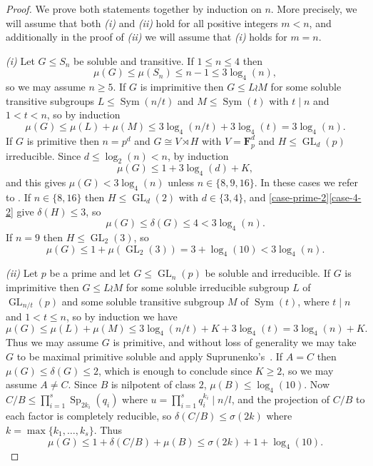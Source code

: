 \documentclass[11pt,reqno]{amsart}
\numberwithin{equation}{section}
\theoremstyle{definition}
\theoremstyle{remark}
\def\F{\mathbf{F}}
\newcommand\opr[1]{\operatorname{#1}}
\def\Sym{\opr{Sym}}
\def\GL{\opr{GL}}
\def\Sp{\opr{Sp}}
\numberwithin{equation}{section}
\begin{document}
\begin{proof}
    We prove both statements together by induction on $n$.
    More precisely, we will assume that both \emph{(i)} and \emph{(ii)} hold for all positive integers $m < n$,
    and additionally in the proof of \emph{(ii)} we will assume that \emph{(i)} holds for $m = n$.

    \emph{(i)}
    Let $G \le S_n$ be soluble and transitive. If $1 \le n \le 4$ then
    \[
        \mu(G) \le \mu(S_n) \le n-1 \le 3 \log_4(n),
    \]
    so we may assume $n \ge 5$.
    If $G$ is imprimitive then $G\le L \wr M$ for some soluble transitive subgroups $L\le \Sym(n/t)$ and $M\le \Sym(t)$ with $t \mid n$ and $1 < t < n$, so by induction
    \[
        \mu(G) \le \mu(L) + \mu(M) \le 3\log_4(n/t)+ 3\log_4(t) = 3\log_4(n).
    \]
    If $G$ is primitive then $n = p^d$ and $G \cong V \rtimes H$ with $V = \F_p^d$ and $H \le \GL_d(p)$ irreducible.
    Since $d \le \log_2(n) < n$, by induction
    \[
        \mu(G)\le 1 + 3\log_4(d) + K,
    \]
    and this gives $\mu(G) < 3 \log_4(n)$ unless $n \in \{8, 9, 16\}$.
    In these cases we refer to .
    If $n \in \{8, 16\}$ then $H \le \GL_d(2)$ with $d \in \{3, 4\}$, and \ref{case-prime-2}\ref{case-4-2} give $\delta(H) \le 3$, so
    \[
        \mu(G) \le \delta(G) \le  4 < 3 \log_4(n).
    \]
    If $n = 9$ then $H \le \GL_2(3)$, so
    \[
    \mu(G) \le 1 + \mu(\GL_2(3)) = 3 + \log_4(10) < 3 \log_4(n).
    \]

    \emph{(ii)}
    Let $p$ be a prime and let $G\le \GL_n(p)$ be soluble and irreducible.
    If $G$ is imprimitive then $G\le L \wr M$ for some soluble irreducible subgroup $L$ of $\GL_{n/t}(p)$ and some soluble transitive subgroup $M$ of $\Sym(t)$,
    where $t \mid n$ and $1 < t \le n$,
    so by induction we have
    \[
        \mu(G) \le \mu(L) + \mu(M) \le 3\log_4(n/t) + K + 3 \log_4(t) = 3 \log_4(n) + K.
    \]
    Thus we may assume $G$ is primitive, and without loss of generality we may take $G$ to be maximal primitive soluble and apply Suprunenko's~.
    If $A = C$ then $\mu(G) \le \delta(G) \le 2$, which is enough to conclude since $K \ge 2$, so we may assume $A \neq C$.
    Since $B$ is nilpotent of class $2$, $\mu(B) \le \log_4(10)$.
    Now $C / B \le \prod_{i=1}^s \Sp_{2k_i}(q_i)$ where $u = \prod_{i=1}^s q_i^{k_i} \mid n / l$,
    and the projection of $C / B$ to each factor is completely reducible,
    so $\delta(C / B) \le \sigma(2k)$ where $k = \max\{k_1, \dots, k_s\}$.
    Thus
    \begin{equation}
        \label{eq:mu-bound}
        \mu(G) \le 1 + \delta(C / B) + \mu(B) \le \sigma(2k) + 1 + \log_4(10).
    \end{equation}


\end{proof}
\end{document}
